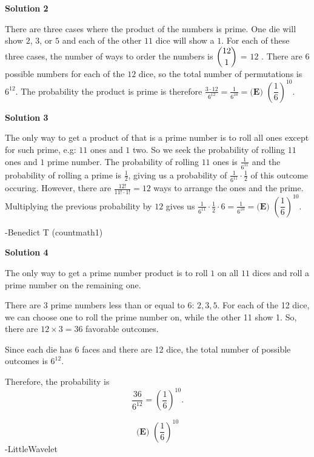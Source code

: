 \begin{enumerate}
 



\textbf{Solution 2}

There are three cases where the product of the numbers is prime. One die will show $2$, $3$, or $5$ and each of the other $11$ dice will show a $1$. For each of these three cases, the number of ways to order the numbers is $\dbinom{12}{1}$ = $12$ . There are $6$ possible numbers for each of the $12$ dice, so the total number of permutations is $6^{12}$. The probability the product is prime is therefore $\frac{3\cdot 12}{6^{12}} = \frac{1}{6^{10}} =\boxed{\textbf{(E) }\left(\dfrac{1}{6}\right)^{10}}$.

 



\textbf{Solution 3}

The only way to get a product of that is a prime number is to roll all ones except for such prime, e.g: $11$ ones and $1$ two. So we seek the probability of rolling $11$ ones and $1$ prime number. The probability of rolling $11$ ones is $\frac{1}{6^{11}}$ and the probability of rolling a prime is $\frac{1}{2}$, giving us a probability of $\frac{1}{6^{11}}\cdot\frac{1}{2}$ of this outcome occuring. However, there are $\frac{12!}{11!\cdot{1!}}=12$ ways to arrange the ones and the prime. Multiplying the previous probability by $12$ gives us $\frac{1}{6^{11}}\cdot\frac{1}{2}\cdot{6}=\frac{1}{6^{10}}=\boxed{\textbf{(E) }\left(\dfrac{1}{6}\right)^{10}}.$

 -Benedict T (countmath1)

 



\textbf{Solution 4}

The only way to get a prime number product is to roll \(1\) on all \(11\) dices and roll a prime number on the remaining one. 

 There are 3 prime numbers less than or equal to 6: \(2, 3, 5\). For each of the 12 dice, we can choose one to roll the prime number on, while the other 11 show 1. So, there are \(12 \times 3 = 36\) favorable outcomes.

 Since each die has 6 faces and there are 12 dice, the total number of possible outcomes is \(6^{12}\).

 Therefore, the probability is 
 \[\frac{36}{6^{12}} = \left(\frac{1}{6}\right)^{10}.\]

 \[\boxed{\textbf{(E) } \left(\dfrac{1}{6}\right)^{10}}\]-LittleWavelet

 



\end{enumerate}
